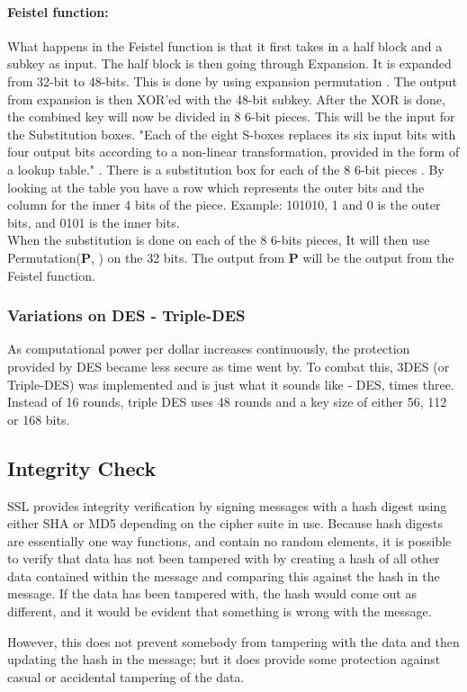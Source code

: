\paragraph{Feistel function:}
What happens in the Feistel function is that it first takes in a half block and a subkey as input. The half block is then going through Expansion.\cite{des1,feistelWiki} It is expanded from 32-bit to 48-bits. This is done by using expansion permutation \cite{tableWiki}. The output from expansion  is then XOR'ed with the 48-bit subkey. After the XOR is done, the combined key will now be divided in 8 6-bit pieces. This will be the input for the Substitution boxes. "Each of the eight S-boxes replaces its six input bits with four output bits according to a non-linear transformation, provided in the form of a lookup table." \cite{desWiki}. There is a substitution box for each of the 8 6-bit pieces \cite{sboxWiki}. By looking at the table you have a row which represents the outer bits and the column for the inner 4 bits of the piece. 
Example: 101010, 1 and 0 is the outer bits, and 0101 is the inner bits.\\
When the substitution is done on each of the 8 6-bits pieces, It will then use Permutation(\textbf{P}, \cite{tableWiki}) on the 32 bits. The output from \textbf{P} will be the output from the Feistel function.\\
\bigskip


\subsubsection{Variations on DES - Triple-DES}
As computational power per dollar increases continuously, the protection provided by DES became less secure as time went by. To combat this, 3DES (or Triple-DES) was implemented and is just what it sounds like - DES, times three. Instead of 16 rounds, triple DES uses 48 rounds and a key size of either 56, 112 or 168 bits.

\subsection{Integrity Check}
SSL provides integrity verification by signing messages with a hash digest using either SHA or MD5 depending on the cipher suite in use. Because hash digests are essentially one way functions, and contain no random elements, it is possible to verify that data has not been tampered with by creating a hash of all other data contained within the message and comparing this against the hash in the message. If the data has been tampered with, the hash would come out as different, and it would be evident that something is wrong with the message.

However, this does not prevent somebody from tampering with the data and then updating the hash in the message; but it does provide some protection against casual or accidental tampering of the data.
